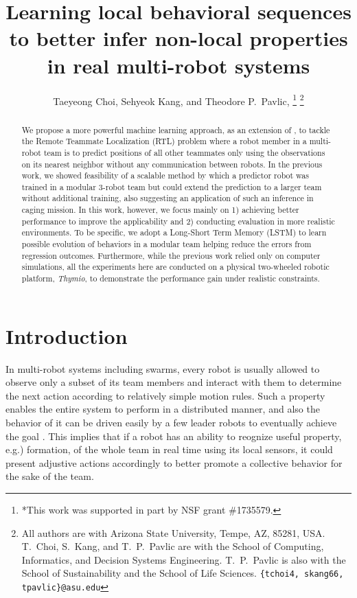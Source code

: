 \documentclass[letterpaper, 10 pt, conference]{ieeeconf}  %
\title{\LARGE \bf
	Learning local behavioral sequences
	to better infer non-local properties in real multi-robot systems
}
\author{Taeyeong Choi, Sehyeok Kang, and Theodore P.~Pavlic, \IEEEmembership{Member, IEEE} %
    \thanks{*This work was supported in part by NSF grant \#1735579.}%
    \thanks{All authors are with Arizona State University, Tempe, AZ,
        85281, USA. T.~Choi, S.~Kang, and T.~P.~Pavlic are with the
        School of Computing, Informatics, and Decision Systems
        Engineering. T.~P.~Pavlic is also with the School of
        Sustainability and the School of Life Sciences.
        {\tt\small \{tchoi4, skang66, tpavlic\}@asu.edu}}%
}
\begin{document}
	\maketitle
	\thispagestyle{empty}
	\pagestyle{empty}


	\begin{abstract}

		We propose a more powerful machine learning approach, as an extension of \cite{CPR17},
		to tackle the Remote Teammate
		Localization (RTL) problem where a robot member in a multi-robot team is to predict positions
		of all other teammates only using the observations on its nearest neighbor without any
		communication between robots.
		In the previous work, we showed feasibility of a scalable method by which
		a predictor robot was trained in a modular 3-robot team but could extend the prediction
		to a larger
		team without additional training, also suggesting an application of such an inference in
		caging mission.
		In this work, however, we focus mainly on 1) achieving better performance
		to improve the applicability and 2) conducting evaluation in
		more realistic environments. To be specific, we adopt a Long-Short Term Memory (LSTM) \cite{HS97}
		to learn possible evolution of behaviors in a modular team helping reduce the errors
		from regression outcomes. Furthermore, while the previous work relied only on computer simulations,
		all the experiments here are conducted on a physical two-wheeled robotic platform, \emph{Thymio},
		to demonstrate the performance gain under realistic constraints.

	\end{abstract}



	\section{Introduction}
	\label{sec:intro}

	In multi-robot systems including swarms, every robot is usually allowed to observe
	only a subset of its team members and interact with them to determine the next action
	according to relatively simple motion rules.
	Such a property enables the entire system to perform in a distributed manner, and
	also the behavior of it can be driven easily by a few leader robots to
	eventually achieve the goal \cite{CPR17, DGRSS17, EB16, Stern18}.
	This implies that if a robot has an ability to reognize useful property, e.g.) formation,
	of the whole team in real time using its local sensors,
	it could present adjustive actions accordingly to better promote a collective behavior
	for the sake of the team.
\end{document}
